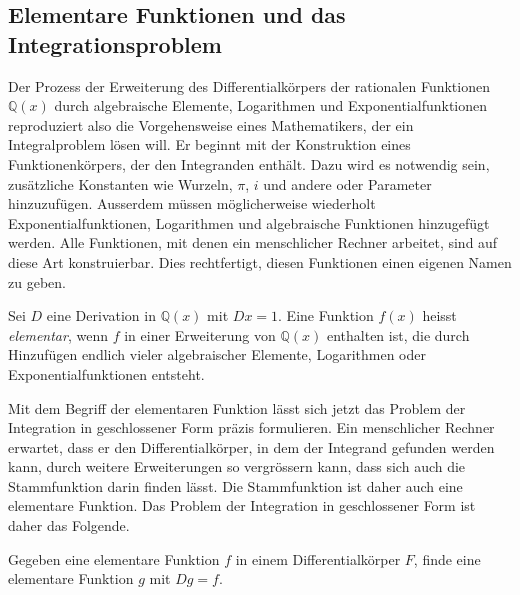 %
%
\subsection{Elementare Funktionen und das Integrationsproblem}
Der Prozess der Erweiterung des Differentialkörpers der 
rationalen Funktionen $\mathbb{Q}(x)$ durch algebraische Elemente,
Logarithmen und Exponentialfunktionen reproduziert also die Vorgehensweise
eines Mathematikers, der ein Integralproblem lösen will.
Er beginnt mit der Konstruktion eines Funktionenkörpers, der den
Integranden enthält.
Dazu wird es notwendig sein, zusätzliche Konstanten wie Wurzeln,
$\pi$, $i$ und andere oder Parameter hinzuzufügen.
Ausserdem müssen möglicherweise wiederholt Exponentialfunktionen,
Logarithmen und algebraische Funktionen hinzugefügt werden.
Alle Funktionen, mit denen ein menschlicher Rechner arbeitet, sind
auf diese Art konstruierbar.
Dies rechtfertigt, diesen Funktionen einen eigenen Namen zu geben.

\begin{definition}
Sei $D$ eine Derivation in $\mathbb{Q}(x)$ mit $Dx=1$.
Eine Funktion $f(x)$ heisst \emph{elementar}, wenn $f$ in einer
Erweiterung von $\mathbb{Q}(x)$ enthalten ist, die durch Hinzufügen
endlich vieler algebraischer Elemente, Logarithmen oder Exponentialfunktionen
entsteht.
%
\end{definition}

Mit dem Begriff der elementaren Funktion lässt sich jetzt das
Problem der Integration in geschlossener Form präzis formulieren.
%
Ein menschlicher Rechner erwartet, dass er den Differentialkörper,
in dem der Integrand gefunden werden kann, durch weitere Erweiterungen
so vergrössern kann, dass sich auch die Stammfunktion darin finden
lässt.
Die Stammfunktion ist daher auch eine elementare Funktion.
Das Problem der Integration in geschlossener Form ist daher das
Folgende.

\begin{problem}
%
Gegeben eine elementare Funktion $f$ in einem Differentialkörper
$F$, finde eine elementare Funktion $g$ mit $Dg = f$.
\end{problem}
